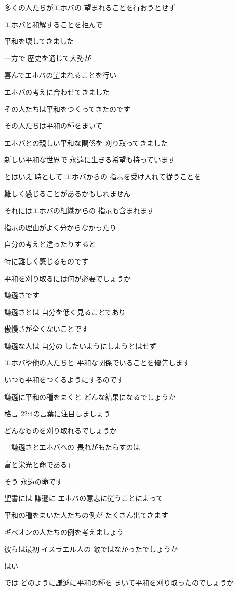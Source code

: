 \documentclass[twocolumn]{jsarticle}
\begin{document}
多くの人たちがエホバの
望まれることを行おうとせず

エホバと和解することを拒んで

平和を壊してきました

一方で 歴史を通じて大勢が

喜んでエホバの望まれることを行い

エホバの考えに合わせてきました

その人たちは平和をつくってきたのです

その人たちは平和の種をまいて

エホバとの親しい平和な関係を
刈り取ってきました

新しい平和な世界で
永遠に生きる希望も持っています

とはいえ 時として エホバからの
指示を受け入れて従うことを

難しく感じることがあるかもしれません

それにはエホバの組織からの
指示も含まれます

指示の理由がよく分からなかったり

自分の考えと違ったりすると

特に難しく感じるものです

平和を刈り取るには何が必要でしょうか

謙遜さです

謙遜さとは 自分を低く見ることであり

傲慢さが全くないことです

謙遜な人は 自分の
したいようにしようとはせず

エホバや他の人たちと
平和な関係でいることを優先します

いつも平和をつくるようにするのです

謙遜に平和の種をまくと
どんな結果になるでしょうか

格言 22:4の言葉に注目しましょう

どんなものを刈り取れるでしょうか

「謙遜さとエホバへの
畏れがもたらすのは

富と栄光と命である」

そう 永遠の命です

聖書には 謙遜に
エホバの意志に従うことによって

平和の種をまいた人たちの例が
たくさん出てきます

ギベオンの人たちの例を考えましょう

彼らは最初 イスラエル人の
敵ではなかったでしょうか

はい

では どのように謙遜に平和の種を
まいて平和を刈り取ったのでしょうか
\end{document}
